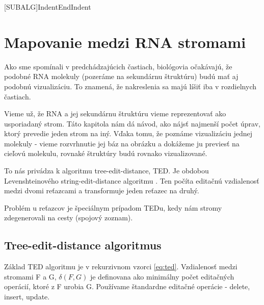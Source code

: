 \newcommand{\Cdel}{\ensuremath{c_{del}}}
\newcommand{\Cins}{\ensuremath{c_{ins}}}
\newcommand{\Cupd}{\ensuremath{c_{upd}}}

\newcommand{\AfullDecomposition}{\ensuremath{\mathcal{A}}}
\newcommand{\FrelevantSubforests}{\ensuremath{\mathcal{F}}}
\newcommand{\pluseq}{\stackrel{+}{=}}
\newcommand{\AlgCase}{$\left\{\rule{0pt}{\baselineskip}\right.$\parbox{\textwidth}}

\newcommand{\rtedCostSum}[3]{\sum_{{#1}' \in #1 - \gamma^{#2}(#1)}cena({#1}', #3)}
\newcommand{\set}[1]{\ensuremath{\{#1\}}}


[SUBALG]{Indent}{EndIndent}{}{\algorithmicend\ }


\chapter{Mapovanie medzi RNA stromami}

Ako sme spomínali v predchádzajúcich častiach, biológovia očakávajú, že
podobné RNA molekuly (pozeráme na sekundárnu štruktúru) budú mať aj podobnú vizualizáciu.
To znamená, že nakreslenia sa majú líšiť iba v rozdielnych častiach.

Vieme už, že RNA a jej sekundárnu štruktúru vieme reprezentovať ako usporiadaný strom.
Táto kapitola nám dá návod, ako nájsť najmenší počet úprav, ktorý prevedie jeden strom
na iný. Vďaka tomu, že poznáme vizualizáciu jednej molekuly - vieme rozvrhnutie jej báz na
obrázku a dokážeme ju previesť na cieľovú molekulu, rovnaké štruktúry budú rovnako vizualizované.

To nás privádza k algoritmu tree-edit-distance, TED. Je obdobou Levenshteinového
string-edit-distance algoritmu .
Ten počíta editačnú vzdialenosť medzi dvomi reťazcami a transformuje
jeden reťazec na druhý.

Problém u reťazcov je špeciálnym prípadom TEDu, kedy nám stromy zdegenerovali
na cesty (spojový zoznam).

\section{Tree-edit-distance algoritmus}

Základ TED algoritmu je v rekurzivnom vzorci \ref{eq:ted}. Vzdialenosť medzi
stromami F a G, $\delta(F, G)$ je definovana ako minimálny počet editačných operácií,
ktoré z F urobia G. Používame štandardne editačné operácie - delete, insert, update.

